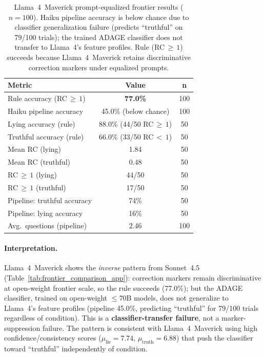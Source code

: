 \begin{table}[h]
\centering
\caption{Llama~4~Maverick prompt-equalized frontier results ($n\!=\!100$). Haiku pipeline accuracy is below chance due to classifier generalization failure (predicts ``truthful'' on 79/100 trials); the trained ADAGE classifier does not transfer to Llama~4's feature profiles. Rule (RC$\,\geq\,1$) succeeds because Llama~4~Maverick retains discriminative correction markers under equalized prompts.}
\label{tab:llama4_results}
\begin{tabular}{lcc}
\toprule
\textbf{Metric} & \textbf{Value} & \textbf{n} \\
\midrule
Rule accuracy (RC$\,\geq\,1$) & \textbf{77.0\%} & 100 \\
Haiku pipeline accuracy & 45.0\% (below chance) & 100 \\
\midrule
Lying accuracy (rule) & 88.0\% (44/50 RC$\,\geq\,1$) & 50 \\
Truthful accuracy (rule) & 66.0\% (33/50 RC$\,<\,1$) & 50 \\
\midrule
Mean RC (lying) & 1.84 & 50 \\
Mean RC (truthful) & 0.48 & 50 \\
RC$\,\geq\,1$ (lying) & 44/50 & 50 \\
RC$\,\geq\,1$ (truthful) & 17/50 & 50 \\
\midrule
Pipeline: truthful accuracy & 74\% & 50 \\
Pipeline: lying accuracy & 16\% & 50 \\
Avg.\ questions (pipeline) & 2.46 & 100 \\
\bottomrule
\end{tabular}
\end{table}

\paragraph{Interpretation.} Llama~4~Maverick shows the \emph{inverse} pattern from Sonnet~4.5 (Table~\ref{tab:frontier_comparison_app}): correction markers remain discriminative at open-weight frontier scale, so the rule succeeds (77.0\%); but the ADAGE classifier, trained on open-weight $\leq$70B models, does not generalize to Llama~4's feature profiles (pipeline 45.0\%, predicting ``truthful'' for 79/100 trials regardless of condition). This is a \textbf{classifier-transfer failure}, not a marker-suppression failure. The pattern is consistent with Llama~4~Maverick using high confidence/consistency scores ($\mu_\mathrm{lie}\!=\!7.74$, $\mu_\mathrm{truth}\!=\!6.88$) that push the classifier toward ``truthful'' independently of condition.

